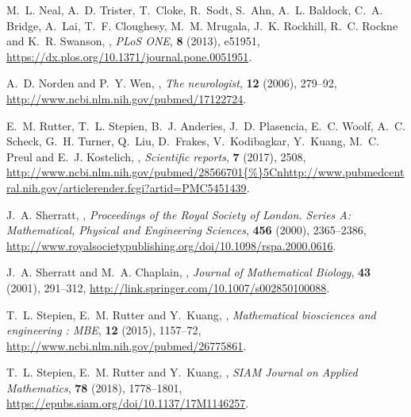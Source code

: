 \documentclass{aims}
\numberwithin{equation}{section}
\begin{document}
\begin{thebibliography}{10}
\newblock M.~L. Neal, A.~D. Trister, T.~Cloke, R.~Sodt, S.~Ahn, A.~L. Baldock,
  C.~A. Bridge, A.~Lai, T.~F. Cloughesy, M.~M. Mrugala, J.~K. Rockhill, R.~C.
  Rockne and K.~R. Swanson,
,
\newblock \emph{PLoS ONE}, \textbf{8} (2013), e51951,
\newblock \urlprefix\url{https://dx.plos.org/10.1371/journal.pone.0051951}.

\newblock A.~D. Norden and P.~Y. Wen,
,
\newblock \emph{The neurologist}, \textbf{12} (2006), 279--92,
\newblock \urlprefix\url{http://www.ncbi.nlm.nih.gov/pubmed/17122724}.

\newblock E.~M. Rutter, T.~L. Stepien, B.~J. Anderies, J.~D. Plasencia, E.~C.
  Woolf, A.~C. Scheck, G.~H. Turner, Q.~Liu, D.~Frakes, V.~Kodibagkar,
  Y.~Kuang, M.~C. Preul and E.~J. Kostelich,
,
\newblock \emph{Scientific reports}, \textbf{7} (2017), 2508,
\newblock
  \urlprefix\url{http://www.ncbi.nlm.nih.gov/pubmed/28566701{\%}5Cnhttp://www.pubmedcentral.nih.gov/articlerender.fcgi?artid=PMC5451439}.

\newblock J.~A. Sherratt,
,
\newblock \emph{Proceedings of the Royal Society of London. Series A:
  Mathematical, Physical and Engineering Sciences}, \textbf{456} (2000),
  2365--2386,
\newblock
  \urlprefix\url{http://www.royalsocietypublishing.org/doi/10.1098/rspa.2000.0616}.

\newblock J.~A. Sherratt and M.~A. Chaplain,
,
\newblock \emph{Journal of Mathematical Biology}, \textbf{43} (2001), 291--312,
\newblock \urlprefix\url{http://link.springer.com/10.1007/s002850100088}.

\newblock T.~L. Stepien, E.~M. Rutter and Y.~Kuang,
,
\newblock \emph{Mathematical biosciences and engineering : MBE}, \textbf{12}
  (2015), 1157--72,
\newblock \urlprefix\url{http://www.ncbi.nlm.nih.gov/pubmed/26775861}.

\newblock T.~L. Stepien, E.~M. Rutter and Y.~Kuang,
,
\newblock \emph{SIAM Journal on Applied Mathematics}, \textbf{78} (2018),
  1778--1801,
\newblock \urlprefix\url{https://epubs.siam.org/doi/10.1137/17M1146257}.


\end{thebibliography}
\end{document}
